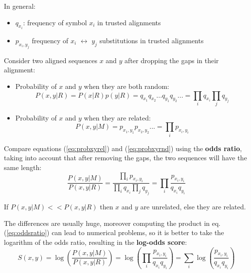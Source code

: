 In general:
\begin{itemize}
\item $q_{x_i}$: frequency of symbol $x_i$ in trusted alignments
\item $p_{x_i, y_j}$ frequency of $x_i$ $\leftrightarrow$ $y_j$ substitutions in trusted alignments
\end{itemize}


Consider two aligned sequences $x$ and $y$ after dropping the gaps in their alignment:
\begin{itemize}
\item Probability of $x$ and $y$ when they are both random:
\begin{equation}
P(x, y|R) = P(x|R) p(y|R) = q_{x_1} q_{x_2} ... q_{y_1} q_{y_2} ... 
          = \prod_i q_{x_i} \prod_j q_{y_j}
\label{eq:probxyrnd}
\end{equation}
\item Probability of $x$ and $y$ when they are related:
\begin{equation}
P(x,y|M) = p_{x_1,y_1} p_{x_2,y_2} ... = \prod_i p_{x_i, y_i}
\label{eq:probxyrel}
\end{equation}
\end{itemize}

Compare equations (\ref{eq:probxyrel}) and (\ref{eq:probxyrnd}) using the {\bf odds ratio}, taking into account that after removing the gaps, the two sequences will have the same length:
\begin{equation}
\frac{P(x,y|M)}{P(x,y|R)} = 
\frac{\prod_i p_{x_i, y_i}}{\prod_i q_{x_i} \prod_j q_{y_j}} =
\prod_i \frac{p_{x_i, y_i}}{q_{x_i} q_{y_i}}
\label{eq:oddsratio}
\end{equation}

If $P(x,y|M) << P(x,y|R)$ then $x$ and $y$ are unrelated, else they are related.

The differences %
are usually huge, moreover computing the product in eq. (\ref{eq:oddsratio}) can lead to numerical problems, so it is better to take the logarithm of the odds ratio, resulting in the {\bf log-odds score}:
\begin{equation}
S(x,y) = 
\log \left( \frac{P(x,y|M)}{P(x,y|R)} \right) =
\log \left( \prod_i \frac{p_{x_i, y_i}}{q_{x_i} q_{y_i}} \right) =
\sum_i \log \left( \frac{p_{x_i, y_i}}{q_{x_i} q_{y_i}} \right)
\end{equation}


